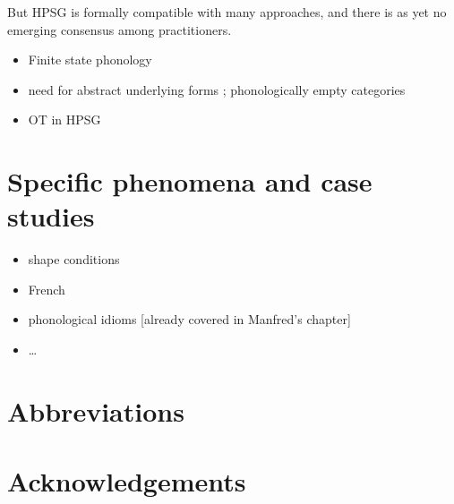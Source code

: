 \documentclass[output=paper]{langsci/langscibook}
\begin{document}
But HPSG is formally compatible with many approaches, and there is as
yet no emerging consensus among practitioners.
\begin{itemize}
\item Finite state phonology \citep{Bird92a,Bird95a}

\item need for abstract underlying forms \citep{Skwarski09};
  phonologically empty categories 

\item OT in HPSG \citep{Orgun96a}

\end{itemize}

\section{Specific phenomena and case studies}

\begin{itemize}
\item shape conditions \citep{AKlein2002a}
\item French \citep{TsengLiaison,BBT04}
\item phonological idioms [already covered in Manfred's chapter]
\item \ldots
\end{itemize}
 
\section*{Abbreviations}
\section*{Acknowledgements}

\printbibliography[heading=subbibliography,notkeyword=this] 
\end{document}
